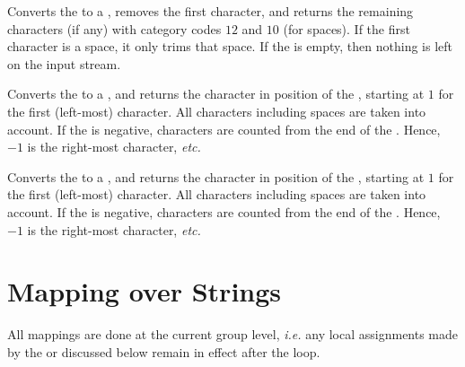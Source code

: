 \documentclass[oneside]{book}
\begin{document}
\begin{function}{\StrVarTail}
\begin{syntax}
 
\end{syntax}
Converts the  to a , removes the first
character, and returns the remaining characters (if any)
with category codes $12$ and $10$ (for spaces).
If the first character is a space, it only trims that space.
If the  is empty,
then nothing is left on the input stream.
\end{function}

\begin{function}{\StrItem}
\begin{syntax}
  
\end{syntax}
Converts the  to a ,
and returns the character in position  of
the , starting at $1$ for the first (left-most)
character. All characters including spaces are taken into account.
If the  is negative,
characters are counted from the end of the . Hence,
$-1$ is the right-most character, \emph{etc.}
\end{function}

\begin{function}{\StrVarItem}
\begin{syntax}
  
\end{syntax}
Converts the  to a ,
and returns the character in position  of
the , starting at $1$ for the first (left-most)
character. All characters including spaces are taken into account.
If the  is negative,
characters are counted from the end of the . Hence,
$-1$ is the right-most character, \emph{etc.}
\end{function}

\section{Mapping over Strings}

All mappings are done at the current group level, \emph{i.e.} any
local assignments made by the  or  discussed
below remain in effect after the loop.

\end{document}
